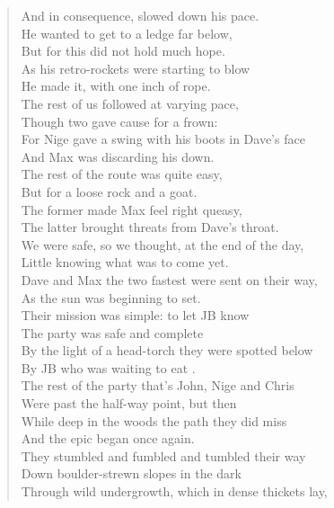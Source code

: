 \documentclass[a5paper,openany,font 10pt]{scrbook}
\begin{document}
\begin{verse}
And in consequence, slowed down his pace.\\
He wanted to get to a ledge far below,\\
But for this did not hold much hope.\\
As his retro-rockets were starting to blow\\
He made it, with one inch of rope.\\
\vspace*{1em}
The rest of us followed at varying pace,\\
Though two gave cause for a frown:\\
For Nige gave a swing with his boots in Dave's face\\
And Max was discarding his down.\\
\vspace*{1em}
The rest of the route was quite easy,\\
But for a loose rock and a goat.\\
The former made Max feel right queasy,\\
The latter brought threats from Dave's throat.\\
\vspace*{1em}
We were safe, so we thought, at the end of the day,\\
Little knowing what was to come yet.\\
Dave and Max  the two fastest  were sent on their way,\\
As the sun was beginning to set.\\
\vspace*{1em}
Their mission was simple: to let JB know\\
The party was safe and complete\\
By the light of a head-torch they were spotted below\\
By JB  who was waiting to eat .\\
\vspace*{1em}
The rest of the party  that's John, Nige and Chris\\
Were past the half-way point, but then\\
While deep in the woods the path they did miss\\
And the epic began once again.\\
\vspace*{1em}
They stumbled and fumbled and tumbled their way\\
Down boulder-strewn slopes in the dark\\
Through wild undergrowth, which in dense thickets lay,\\

\end{verse}
\end{document}
